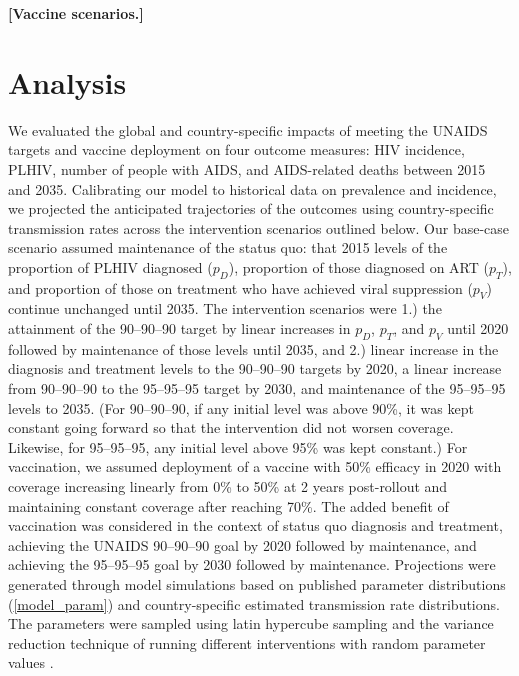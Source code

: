 \documentclass{article}
\newcommand{\comment}[1]{\textbf{[#1]}}
\begin{document}
\comment{Vaccine scenarios.}


\section{Analysis}

We evaluated the global and country-specific impacts of meeting the
UNAIDS targets and vaccine deployment on four outcome measures: HIV
incidence, PLHIV, number of people with AIDS, and AIDS-related deaths
between 2015 and 2035. Calibrating our model to historical data on
prevalence and incidence, we projected the anticipated trajectories of
the outcomes using country-specific transmission rates across the
intervention scenarios outlined below.  Our base-case scenario assumed
maintenance of the status quo: that 2015 levels of the proportion of
PLHIV diagnosed ($p_{D}$), proportion of those diagnosed on ART
($p_{T}$), and proportion of those on treatment who have achieved
viral suppression ($p_{V}$) continue unchanged until 2035.  The
intervention scenarios were 1.) the attainment of the 90--90--90
target by linear increases in $p_{D}$, $p_{T}$, and $p_{V}$ until 2020
followed by maintenance of those levels until 2035, and 2.) linear
increase in the diagnosis and treatment levels to the 90--90--90
targets by 2020, a linear increase from 90--90--90 to the 95--95--95
target by 2030, and maintenance of the 95--95--95 levels to 2035. (For
90--90--90, if any initial level was above 90\%, it was kept constant
going forward so that the intervention did not worsen coverage.
Likewise, for 95--95--95, any initial level above 95\% was kept
constant.)  For vaccination, we assumed deployment of a vaccine with
50\% efficacy in 2020 with coverage increasing linearly from 0\% to
50\% at 2 years post-rollout and maintaining constant coverage after
reaching 70\%. The added benefit of vaccination was considered in the
context of status quo diagnosis and treatment, achieving the UNAIDS
90–90–90 goal by 2020 followed by maintenance, and achieving the
95–95–95 goal by 2030 followed by maintenance.  Projections were
generated through model simulations based on published parameter
distributions (\autoref{model_param}) and country-specific estimated
transmission rate distributions. The parameters were sampled using
latin hypercube sampling \cite{blower1994} and the variance reduction
technique of running different interventions with random parameter
values \cite{shechter2006}.
\end{document}
